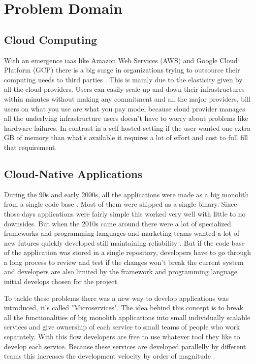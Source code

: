 \section{Problem Domain}

\subsection{Cloud Computing}
With an emergence \ac{iaas} like Amazon Web Services (AWS) and Google Cloud Platform (GCP) there is a big surge in organizations trying to outsource their computing needs to third parties \citep{rimol_2021}. This is mainly due to the elasticity given by all the cloud providers. Users can easily scale up and down their infrastructures within minutes without making any commitment and all the major providers, bill users on what you use are what you pay model because cloud provider manages all the underlying infrastructure users doesn't have to worry about problems like hardware failures. In contrast in a self-hosted setting if the user wanted one extra GB of memory than what's available it requires a lot of effort and cost to full fill that requirement.

\subsection{Cloud-Native Applications}
During the 90s and early 2000s, all the applications were made as a big monolith from a single code base \citep{LessonsF52:online}. Most of them were shipped as a single binary. Since those days applications were fairly simple this worked very well with little to no downsides. But when the 2010s came around there were a lot of specialized frameworks and programming languages and marketing teams wanted a lot of new futures quickly developed still maintaining reliability \citep{di2018migrating,Microser52:online}. But if the code base of the application was stored in a single repository, developers have to go through a long process to review and test if the changes won't break the current system and developers are also limited by the framework and programming language initial develops chosen for the project.

To tackle these problems there was a new way to develop applications was introduced, it's called "Microservices". The idea behind this concept is to break all the functionalities of big monolith applications into small individually scalable services and give ownership of each service to small teams of people who work separately. With this flow developers are free to use whatever tool they like to develop each service. Because these services are developed parallelly by different teams this increases the development velocity by order of magnitude \citep{Understa56:online}.

